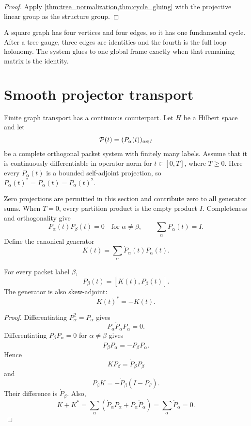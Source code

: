 \begin{proof}
Apply \cref{thm:tree_normalization,thm:cycle_gluing} with the projective linear group as the structure group.
\end{proof}

\begin{example}\label{ex:square_loop}
A square graph has four vertices and four edges, so it has one fundamental cycle.  After a tree gauge, three edges are identities and the fourth is the full loop holonomy.  The system glues to one global frame exactly when that remaining matrix is the identity.
\end{example}

\section{Smooth projector transport}\label{sec:kato_transport}

Finite graph transport has a continuous counterpart.  Let $H$ be a Hilbert space and let
\[
\mathcal P(t)=(P_\alpha(t))_{\alpha\in I}
\]
be a complete orthogonal packet system with finitely many labels. Assume that it is continuously differentiable in operator norm for $t\in[0,T]$, where $T\ge0$. Here every $P_\alpha(t)$ is a bounded self-adjoint projection, so $P_\alpha(t)^*=P_\alpha(t)=P_\alpha(t)^2$.

Zero projections are permitted in this section and contribute zero to all generator sums. When $T=0$, every partition product is the empty product $I$. Completeness and orthogonality give
\[
P_\alpha(t)P_\beta(t)=0
\quad\text{for }\alpha\ne\beta,
\qquad
\sum_\alpha P_\alpha(t)=I.
\]
Define the canonical generator
\[
K(t)=\sum_\alpha \dot P_\alpha(t)P_\alpha(t).
\]

\begingroup
\setlength{\abovedisplayskip}{6pt plus 2pt minus 2pt}
\setlength{\belowdisplayskip}{6pt plus 2pt minus 2pt}
\begin{lemma}\label{lem:packet_commutator}
For every packet label $\beta$,
\[
\dot P_\beta(t)=[K(t),P_\beta(t)].
\]
The generator is also skew-adjoint:
\[
K(t)^*=-K(t).
\]
\end{lemma}

\begin{proof}
Differentiating $P_\alpha^2=P_\alpha$ gives
\[
P_\alpha\dot P_\alpha P_\alpha=0.
\]
Differentiating $P_\beta P_\alpha=0$ for $\alpha\ne\beta$ gives
\[
P_\beta\dot P_\alpha=-\dot P_\beta P_\alpha.
\]
Hence
\[
K P_\beta=\dot P_\beta P_\beta
\]
and
\[
P_\beta K=-\dot P_\beta(I-P_\beta).
\]
Their difference is $\dot P_\beta$.  Also,
\[
K+K^*
=
\sum_\alpha(\dot P_\alpha P_\alpha+P_\alpha\dot P_\alpha)
=
\sum_\alpha\dot P_\alpha
=0.
\]
\end{proof}
\endgroup

